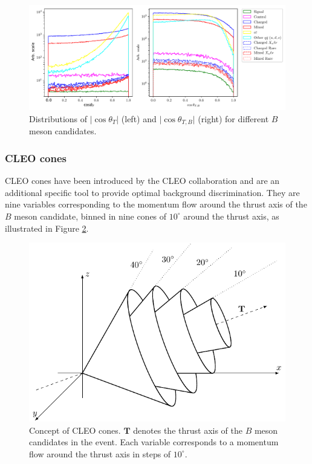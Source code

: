 \documentclass[headings=standardclasses,headings=big,oneside,a4paper,openany,12pt]{scrbook}
\begin{document}
\begin{figure}[H]
\centering
\captionsetup{width=0.8\linewidth}
\includegraphics[width=\linewidth]{fig/cs_cosplots}
\caption{Distributions of $\vert \cos\theta_T\vert$ (left) and $\vert \cos\theta_{T,B}\vert$ (right) for different $B$ meson candidates.}
\label{fig:cosplots}
\end{figure}

\subsubsection{CLEO cones}
CLEO cones have been introduced by the CLEO collaboration \cite{asner1996search} and are an additional specific tool to provide optimal background discrimination. They are nine variables corresponding to the momentum flow around the thrust axis of the $B$ meson candidate, binned in nine cones of $10^\circ$ around the thrust axis, as illustrated in Figure \ref{fig:ccones}. 

\begin{figure}[H]
\centering
\captionsetup{width=0.8\linewidth}
\includegraphics[scale=1]{texfig/CCones}
\caption{Concept of CLEO cones. $\mathbf{T}$ denotes the thrust axis of the $B$ meson candidates in the event. Each variable corresponds to a momentum flow around the thrust axis in steps of $10^\circ$.}
\label{fig:ccones}
\end{figure}
\end{document}
